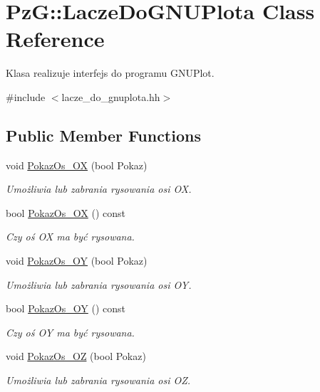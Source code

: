 \hypertarget{classPzG_1_1LaczeDoGNUPlota}{}\section{PzG\+:\+:Lacze\+Do\+G\+N\+U\+Plota Class Reference}
\label{classPzG_1_1LaczeDoGNUPlota}


Klasa realizuje interfejs do programu G\+N\+U\+Plot.  




{\ttfamily \#include $<$lacze\+\_\+do\+\_\+gnuplota.\+hh$>$}

\subsection*{Public Member Functions}
\begin{DoxyCompactItemize}
\item 
void \hyperlink{classPzG_1_1LaczeDoGNUPlota_a11421d7c67deab6b7524cc492407e897}{Pokaz\+Os\+\_\+\+OX} (bool Pokaz)
\begin{DoxyCompactList}\small\item\em Umożliwia lub zabrania rysowania osi OX. \end{DoxyCompactList}\item 
bool \hyperlink{classPzG_1_1LaczeDoGNUPlota_ae112972af57167c3b053bf922bce6bbf}{Pokaz\+Os\+\_\+\+OX} () const
\begin{DoxyCompactList}\small\item\em Czy oś OX ma być rysowana. \end{DoxyCompactList}\item 
void \hyperlink{classPzG_1_1LaczeDoGNUPlota_a7c3db909b266fc30808e86406c04b516}{Pokaz\+Os\+\_\+\+OY} (bool Pokaz)
\begin{DoxyCompactList}\small\item\em Umożliwia lub zabrania rysowania osi OY. \end{DoxyCompactList}\item 
bool \hyperlink{classPzG_1_1LaczeDoGNUPlota_a7298f469f6932f5c808dcf620650b4b8}{Pokaz\+Os\+\_\+\+OY} () const
\begin{DoxyCompactList}\small\item\em Czy oś OY ma być rysowana. \end{DoxyCompactList}\item 
void \hyperlink{classPzG_1_1LaczeDoGNUPlota_a9fabfe88cb1801a5de8923f45f514b99}{Pokaz\+Os\+\_\+\+OZ} (bool Pokaz)
\begin{DoxyCompactList}\small\item\em Umożliwia lub zabrania rysowania osi OZ. \end{DoxyCompactList}\item 

\end{DoxyCompactItemize}
